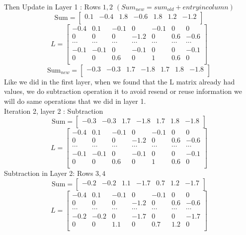 Then Update in Layer 1 : Rows $1,2$ $(Sum_{new} = sum_{old}+ entry in column)$
\[ \text{Sum} = [\begin{matrix}0.1&-0.4&1.8&-0.6&1.8&1.2&-1.2\\\end{matrix}] \]
\[ L=\left[\begin{matrix}-0.4&0.1&-0.1&0&-0.1&0&0\\0&0&0&-1.2&0&0.6&-0.6\\\cdots&\cdots&\cdots&\cdots&\cdots&\cdots&\cdots\\-0.1&-0.1&0&-0.1&0&0&-0.1\\0&0&0.6&0&1&0.6&0\\\end{matrix}\right] \]
\[ \text{Sum}_{new} =  [\begin{matrix}-0.3&-0.3&1.7&-1.8&1.7&1.8&-1.8\\\end{matrix}] \]
Like we did in the first layer, when we found that the L matrix already had values, we do subtraction operation it to avoid resend or reuse information we will do same operations that we did in layer 1.\\
Iteration 2, layer 2 : Subtraction
\[ \text{Sum} =  [\begin{matrix}-0.3&-0.3&1.7&-1.8&1.7&1.8&-1.8\\\end{matrix}] \]
\[ L=\left[\begin{matrix}-0.4&0.1&-0.1&0&-0.1&0&0\\0&0&0&-1.2&0&0.6&-0.6\\\cdots&\cdots&\cdots&\cdots&\cdots&\cdots&\cdots\\-0.1&-0.1&0&-0.1&0&0&-0.1\\0&0&0.6&0&1&0.6&0\\\end{matrix}\right] \]
Subtraction in Layer 2: Rows $3,4$
\[ \text{Sum} =  [\begin{matrix}-0.2&-0.2&1.1&-1.7&0.7&1.2&-1.7\\\end{matrix}] \]
\[ L=\left[\begin{matrix}-0.4&0.1&-0.1&0&-0.1&0&0\\0&0&0&-1.2&0&0.6&-0.6\\\cdots&\cdots&\cdots&\cdots&\cdots&\cdots&\cdots\\-0.2&-0.2&0&-1.7&0&0&-1.7\\0&0&1.1&0&0.7&1.2&0\\\end{matrix}\right] \]
